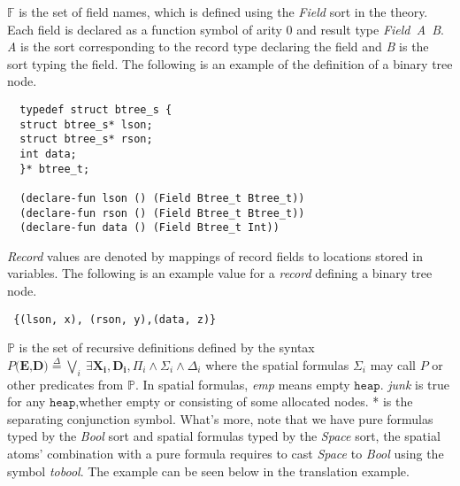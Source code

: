 \documentclass{article}
\theoremstyle{plain}
\begin{document}
$\mathbb{F}$ is the set of field names, which is defined using the \textit{Field} sort in the theory. Each field is declared as a function symbol of arity 0 and result type \textit{Field\ A\ B}. \textit{A} is the sort corresponding to the record type declaring the field and \textit{B} is the sort typing the field. The following is an example of the definition of a binary tree node.
\begin{verbatim}
  typedef struct btree_s {
  struct btree_s* lson;
  struct btree_s* rson;
  int data;
  }* btree_t;
  
  (declare-fun lson () (Field Btree_t Btree_t))
  (declare-fun rson () (Field Btree_t Btree_t))
  (declare-fun data () (Field Btree_t Int))
\end{verbatim}

\textit{Record} values are denoted by mappings of record fields to locations stored in variables. The following is an example value for a \textit{record} defining a binary tree node.
\begin{verbatim}
 {(lson, x), (rson, y),(data, z)}
\end{verbatim}

$\mathbb{P}$ is the set of recursive definitions defined by the syntax $P(\mathbf{E}\text{,}\mathbf{D}\text{)}\overset{\Delta}{=}\bigvee_{i}\ \exists \mathbf{X_i},\mathbf{D_i},\Pi_i\wedge \Sigma_i \wedge \Delta_i$ where the spatial formulas $\Sigma_i$ may call $P$ or other predicates from $\mathbb{P}$. In spatial formulas, \textit{emp} means empty $\mathtt{heap}$.  \textit{junk} is true for any $\mathtt{heap}$,whether empty or consisting of some allocated nodes. * is the separating conjunction symbol. What's more, note that we have pure formulas typed by the \textit{Bool} sort and spatial formulas typed by the \textit{Space} sort, the spatial atoms' combination with a pure formula requires to cast \textit{Space} to \textit{Bool} using the symbol \textit{tobool}. The example can be seen below in the translation example.
\end{document}

